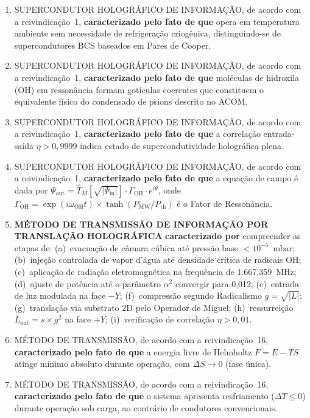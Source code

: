 \documentclass[12pt,a4paper]{article}
\newcommand{\alphaii}{\alpha^2}
\newcommand{\TM}{\hat{T}_M}
\newcommand{\GOH}{\Gamma_{\text{OH}}}
\begin{document}
\begin{enumerate}
\item SUPERCONDUTOR HOLOGRÁFICO DE INFORMAÇÃO, de acordo com a
reivindicação~1, \textbf{caracterizado pelo fato de que} opera em
temperatura ambiente sem necessidade de refrigeração criogênica,
distinguindo-se de supercondutores BCS baseados em Pares de
Cooper.

\item SUPERCONDUTOR HOLOGRÁFICO DE INFORMAÇÃO, de acordo com a
reivindicação~1, \textbf{caracterizado pelo fato de que}
moléculas de hidroxila (OH) em ressonância formam gotículas
coerentes que constituem o equivalente físico do condensado de
psions descrito no ACOM.

\item SUPERCONDUTOR HOLOGRÁFICO DE INFORMAÇÃO, de acordo com a
reivindicação~1, \textbf{caracterizado pelo fato de que} a
correlação entrada-saída $\eta > 0{,}9999$ indica estado de
supercondutividade holográfica plena.

\item SUPERCONDUTOR HOLOGRÁFICO DE INFORMAÇÃO, de acordo com a
reivindicação~1, \textbf{caracterizado pelo fato de que} a
equação de campo é dada por $\Psi_{\text{out}} =
\TM[\sqrt{|\Psi_{\text{in}}|}] \cdot \GOH \cdot e^{i\theta}$,
onde $\GOH = \exp(i\omega_{\text{OH}} t) \times
\tanh(P_{\text{MW}}/P_{\text{th}})$ é o Fator de Ressonância.

\item \textbf{MÉTODO DE TRANSMISSÃO DE INFORMAÇÃO POR TRANSLAÇÃO
HOLOGRÁFICA} \textbf{caracterizado por} compreender as etapas de:
(a)~evacuação de câmara cúbica até pressão base $< 10^{-5}$~mbar;
(b)~injeção controlada de vapor d'água até densidade crítica de
radicais OH; (c)~aplicação de radiação eletromagnética na
frequência de 1.667,359~MHz; (d)~ajuste de potência até o
parâmetro $\alphaii$ convergir para 0,012; (e)~entrada de luz
modulada na face $-Y$; (f)~compressão segundo Radicalismo
$g = \sqrt{|L|}$; (g)~translação via substrato 2D pelo Operador
de Miguel; (h)~ressurreição $L_{\text{out}} = s \times g^2$ na
face $+Y$; (i)~verificação de correlação $\eta > 0{,}01$.

\item MÉTODO DE TRANSMISSÃO, de acordo com a reivindicação~16,
\textbf{caracterizado pelo fato de que} a energia livre de
Helmholtz $F = E - TS$ atinge mínimo absoluto durante operação,
com $\Delta S \to 0$ (fase única).

\item MÉTODO DE TRANSMISSÃO, de acordo com a reivindicação~16,
\textbf{caracterizado pelo fato de que} o sistema apresenta
resfriamento ($\Delta T \leq 0$) durante operação sob carga, ao
contrário de condutores convencionais.


\end{enumerate}
\end{document}
